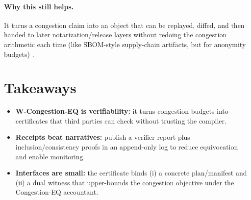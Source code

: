 \documentclass[11pt]{article}
\begin{document}
\paragraph{Why this still helps.}
It turns a congestion claim into an object that can be replayed, diffed, and then handed to later notarization/release layers without redoing the congestion arithmetic each time (like SBOM-style supply-chain artifacts, but for anonymity budgets) \cite{torresarias_intoto_sec19,sigstore_acm2022,slsa_v1}.

\section{Takeaways}
\begin{itemize}[leftmargin=*]
\item \textbf{W-Congestion-EQ is verifiability:} it turns congestion budgets into certificates that third parties can check without trusting the compiler.
\item \textbf{Receipts beat narratives:} publish a verifier report plus inclusion/consistency proofs in an append-only log to reduce equivocation and enable monitoring.
\item \textbf{Interfaces are small:} the certificate binds (i) a concrete plan/manifest and (ii) a dual witness that upper-bounds the congestion objective under the Congestion-EQ accountant.
\end{itemize}
\end{document}
